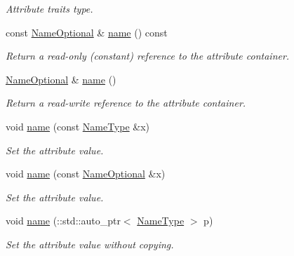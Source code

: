 \begin{DoxyCompactItemize}
\begin{DoxyCompactList}\small\item\em Attribute traits type. \item\end{DoxyCompactList}\item 
const \hyperlink{classopenstack_1_1xml_1_1Server_a500c18b8787bfe281ea268fc8e4fcc82}{NameOptional} \& \hyperlink{classopenstack_1_1xml_1_1Server_ade6f28d5f35db5c532e2dc8aa1d2c0ff}{name} () const 
\begin{DoxyCompactList}\small\item\em Return a read-\/only (constant) reference to the attribute container. \item\end{DoxyCompactList}\item 
\hyperlink{classopenstack_1_1xml_1_1Server_a500c18b8787bfe281ea268fc8e4fcc82}{NameOptional} \& \hyperlink{classopenstack_1_1xml_1_1Server_a496513c3f4312193373c49b5b5d07649}{name} ()
\begin{DoxyCompactList}\small\item\em Return a read-\/write reference to the attribute container. \item\end{DoxyCompactList}\item 
void \hyperlink{classopenstack_1_1xml_1_1Server_a2d12fcbabc2efb9590d9fb938fa112a8}{name} (const \hyperlink{classopenstack_1_1xml_1_1Server_a05dfa427fa9c16be745fcae54a806f7a}{NameType} \&x)
\begin{DoxyCompactList}\small\item\em Set the attribute value. \item\end{DoxyCompactList}\item 
void \hyperlink{classopenstack_1_1xml_1_1Server_a0634c7b58d5b8dea7e5512535acc99ab}{name} (const \hyperlink{classopenstack_1_1xml_1_1Server_a500c18b8787bfe281ea268fc8e4fcc82}{NameOptional} \&x)
\begin{DoxyCompactList}\small\item\em Set the attribute value. \item\end{DoxyCompactList}\item 
void \hyperlink{classopenstack_1_1xml_1_1Server_af92fe3d50cb9ec154f2854f135cac3c3}{name} (::std::auto\_\-ptr$<$ \hyperlink{classopenstack_1_1xml_1_1Server_a05dfa427fa9c16be745fcae54a806f7a}{NameType} $>$ p)
\begin{DoxyCompactList}\small\item\em Set the attribute value without copying. \item\end{DoxyCompactList}\end{DoxyCompactItemize}
